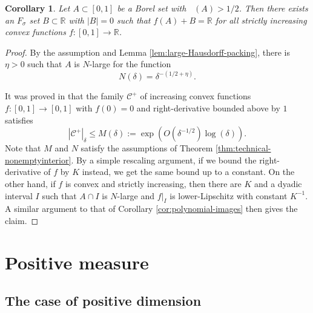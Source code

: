 \documentclass[12pt]{amsart}
\DeclareMathOperator{\pdim}{dim_P}
\newtheorem{corollary}[theorem]{Corollary}
\def\R{{\mathbb{R}}}
\numberwithin{theorem}{section}
\numberwithin{equation}{section}
\begin{document}
\begin{corollary}
    Let $A\subset [0,1]$ be a Borel set with $\pdim(A)>1/2$. Then there exists an $F_\sigma$ set $B\subset \R$ with $|B|=0$ such that $f(A)+B=\R$ for all strictly increasing convex functions $f:[0,1]\to \R$.
\end{corollary}
\begin{proof}
    By the assumption and Lemma \ref{lem:large-Hausdorff-packing}, there is $\eta>0$ such that $A$ is $N$-large for the function
    \[
        N(\delta) = \delta^{-(1/2+\eta)}.
    \]

    It was proved in \cite[Proposition 6.1]{SS15} that the family $\mathcal{C}^+$ of increasing convex functions $f:[0,1]\to [0,1]$ with $f(0)=0$ and right-derivative bounded above by $1$ satisfies
    \[
        |\mathcal{C}^+|_{\delta} \le M(\delta) := \exp\left(O(\delta^{-1/2})\log(\delta)\right).
    \]
    Note that $M$ and $N$ satisfy the assumptions of Theorem \ref{thm:technical-nonemptyinterior}. By a simple rescaling argument, if we bound the right-derivative of $f$ by $K$ instead, we get the same bound up to a constant. On the other hand, if $f$ is convex and strictly increasing, then there are $K$ and a dyadic interval $I$ such that $A\cap I$ is $N$-large and $f|_I$ is lower-Lipschitz with constant $K^{-1}$. A similar argument to that of Corollary \ref{cor:polynomial-images} then gives the claim.
\end{proof}

\section{Positive measure}

\label{sec:full-measure}

\subsection{The case of positive dimension}
\end{document}

